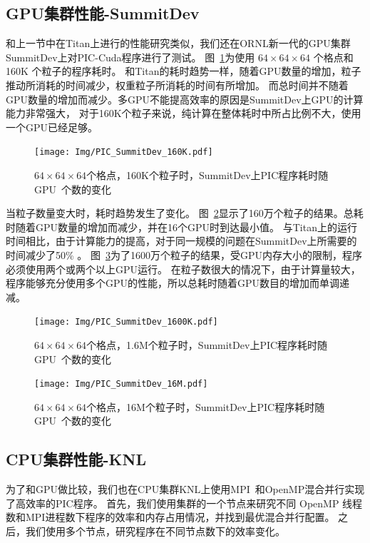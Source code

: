 \subsection{GPU集群性能-SummitDev}
和上一节中在Titan上进行的性能研究类似，我们还在ORNL新一代的GPU集群SummitDev上对PIC-Cuda程序进行了测试。
图~\ref{fig:PIC_SummitDev_160K}为使用 $64\times64\times64$ 个格点和  160K 个粒子的程序耗时。
和Titan的耗时趋势一样，随着GPU数量的增加，粒子推动所消耗的时间减少，权重粒子所消耗的时间有所增加。
而总时间并不随着GPU数量的增加而减少。多GPU不能提高效率的原因是SummitDev上GPU的计算能力非常强大，
对于160K个粒子来说，纯计算在整体耗时中所占比例不大，使用一个GPU已经足够。

\begin{figure}[!htb]
  \centering
  \texttt{[image: Img/PIC\_SummitDev\_160K.pdf]}
  \caption{$64 \times 64 \times 64$个格点，160K个粒子时，SummitDev上PIC程序耗时随GPU~个数的变化}
  \label{fig:PIC_SummitDev_160K}
\end{figure}

当粒子数量变大时，耗时趋势发生了变化。
图~\ref{fig:PIC_SummitDev_1600K}显示了160万个粒子的结果。总耗时随着GPU数量的增加而减少，并在16个GPU时到达最小值。
与Titan上的运行时间相比，由于计算能力的提高，对于同一规模的问题在SummitDev上所需要的时间减少了50\% 。
图~\ref{fig:PIC_SummitDev_16M}为了1600万个粒子的结果，受GPU内存大小的限制，程序必须使用两个或两个以上GPU运行。
在粒子数很大的情况下，由于计算量较大，程序能够充分使用多个GPU的性能，所以总耗时随着GPU数目的增加而单调递减。

\begin{figure}[!htb]
  \centering
  \texttt{[image: Img/PIC\_SummitDev\_1600K.pdf]}
  \caption{$64 \times 64 \times 64$个格点，1.6M个粒子时，SummitDev上PIC程序耗时随GPU~个数的变化}
  \label{fig:PIC_SummitDev_1600K}
\end{figure}

\begin{figure}[!htb]
  \centering
  \texttt{[image: Img/PIC\_SummitDev\_16M.pdf]}
  \caption{$64 \times 64 \times 64$个格点，16M个粒子时，SummitDev上PIC程序耗时随GPU~个数的变化}
  \label{fig:PIC_SummitDev_16M}
\end{figure}

\subsection{CPU集群性能-KNL}        \label{section:PIC_Performance_CPUcluster}
为了和GPU做比较，我们也在CPU集群KNL上使用MPI~和OpenMP混合并行实现了高效率的PIC程序。
首先，我们使用集群的一个节点来研究不同 OpenMP 线程数和MPI进程数下程序的效率和内存占用情况，并找到最优混合并行配置。
之后，我们使用多个节点，研究程序在不同节点数下的效率变化。

